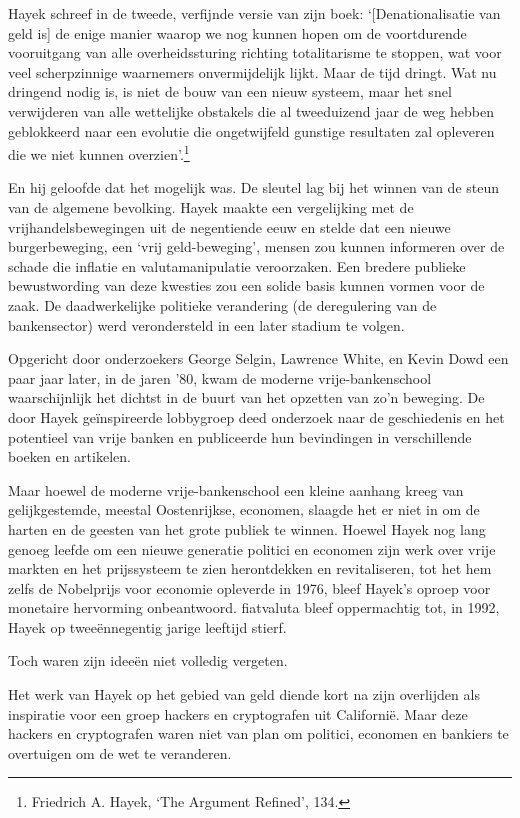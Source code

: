 \documentclass[smalldemyvopaper,11pt,twoside,onecolumn,openright,extrafontsizes,hidelinks]{memoir}
\begin{document}
Hayek schreef in de tweede, verfijnde versie van zijn boek:
`{[}Denationalisatie van geld is{]} de enige manier waarop we nog kunnen
hopen om de voortdurende vooruitgang van alle overheidssturing richting
totalitarisme te stoppen, wat voor veel scherpzinnige waarnemers
onvermijdelijk lijkt. Maar de tijd dringt. Wat nu dringend nodig is, is
niet de bouw van een nieuw systeem, maar het snel verwijderen van alle
wettelijke obstakels die al tweeduizend jaar de weg hebben geblokkeerd
naar een evolutie die ongetwijfeld gunstige resultaten zal opleveren die
we niet kunnen overzien'.\footnote{Friedrich A. Hayek, `The Argument
  Refined', 134.}

En hij geloofde dat het mogelijk was. De sleutel lag bij het winnen van
de steun van de algemene bevolking. Hayek maakte een vergelijking met de
vrijhandelsbewegingen uit de negentiende eeuw en stelde dat een nieuwe
burgerbeweging, een `vrij geld-beweging', mensen zou kunnen informeren
over de schade die inflatie en valutamanipulatie veroorzaken. Een
bredere publieke bewustwording van deze kwesties zou een solide basis
kunnen vormen voor de zaak. De daadwerkelijke politieke verandering (de
deregulering van de bankensector) werd verondersteld in een later
stadium te volgen.

Opgericht door onderzoekers George Selgin, Lawrence White, en Kevin Dowd
een paar jaar later, in de jaren '80, kwam de moderne vrije-bankenschool
waarschijnlijk het dichtst in de buurt van het opzetten van zo'n
beweging. De door Hayek geïnspireerde lobbygroep deed onderzoek naar de
geschiedenis en het potentieel van vrije banken en publiceerde hun
bevindingen in verschillende boeken en artikelen.

Maar hoewel de moderne vrije-bankenschool een kleine aanhang kreeg van
gelijkgestemde, meestal Oostenrijkse, economen, slaagde het er niet in
om de harten en de geesten van het grote publiek te winnen. Hoewel Hayek
nog lang genoeg leefde om een nieuwe generatie politici en economen zijn
werk over vrije markten en het prijssysteem te zien herontdekken en
revitaliseren, tot het hem zelfs de Nobelprijs voor economie opleverde
in 1976, bleef Hayek's oproep voor monetaire hervorming onbeantwoord.
fiatvaluta bleef oppermachtig tot, in 1992, Hayek op tweeënnegentig
jarige leeftijd stierf.

Toch waren zijn ideeën niet volledig vergeten.

Het werk van Hayek op het gebied van geld diende kort na zijn overlijden
als inspiratie voor een groep hackers en cryptografen uit Californië.
Maar deze hackers en cryptografen waren niet van plan om politici,
economen en bankiers te overtuigen om de wet te veranderen.
\end{document}
